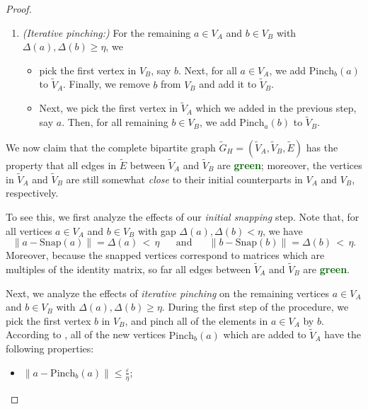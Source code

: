 \documentclass[11pt]{article}
\theoremstyle{plain}
\newcommand{\eps}{\varepsilon}
\begin{document}
\begin{proof}
\begin{enumerate}
\begin{itemize}
    \item delete $a$ from $V_A$ and $b$ from $V_B$.%
\end{itemize}

\item \emph{(Iterative pinching:)} For the remaining $a \in V_A$ and $b \in V_B$ with $\Delta(a),\Delta(b) \geq \eta$, we
\begin{itemize}
\item pick the first vertex in $V_B$, say $b$. Next, for all $a \in V_A$, we add $\mathrm{Pinch}_b(a)$ to $\tilde{V}_A$. Finally, we remove $b$ from $V_B$ and add it to $\tilde{V}_B$.

\item Next, we pick the first vertex in $\tilde{V}_A$ which we added in the previous step, say $a$. Then, for all remaining $b \in V_B$, we add $\mathrm{Pinch}_a(b)$ to $\tilde{V}_B$.
\end{itemize}
\end{enumerate}
We now claim that the complete bipartite graph $\tilde{G}_H = (\tilde{V}_A,\tilde{V}_B,\tilde{E})$ has the property that all edges in $\tilde{E}$ between $\tilde{V}_A$ and $\tilde{V}_B$ are \textbf{\textcolor{DarkGreen}{green}}; moreover, the vertices in $\tilde{V}_A$ and $\tilde{V}_B$ are still somewhat \emph{close} to their initial counterparts in $V_A$ and $V_B$, respectively.

To see this, we first analyze the effects of our \emph{initial snapping} step. Note that, for all vertices $a \in V_A$ and $b \in V_B$ with gap $\Delta(a),\Delta(b) < \eta$, we have
\begin{equation}
\| a- \mathrm{Snap}(a)\| = \Delta(a) \,< \, \eta \quad\,\, \text{ and } \quad \,\, \| b- \mathrm{Snap}(b)\| = \Delta(b) \, < \, \eta.   
\end{equation} 
Moreover, because the snapped vertices correspond to matrices which are multiples of the identity matrix, so far all edges between $\tilde{V}_A$ and $\tilde{V}_B$ are \textbf{\textcolor{DarkGreen}{green}}. 

Next, we analyze the effects of \emph{iterative pinching} on the remaining vertices $a \in V_A$ and $b \in V_B$ with $\Delta(a),\Delta(b) \geq \eta$. During the first step of the procedure, we pick the first vertex $b$ in $V_B$, and pinch all of the elements in $a \in V_A$ by $b$. According to , all of the new vertices $\mathrm{Pinch}_b(a)$ which are added to $\tilde{V}_A$ have the following properties:
\begin{itemize}
    \item $\|a - \mathrm{Pinch}_b(a) \| \leq \frac{\eps}{\eta}$;


\end{itemize}
\end{proof}
\end{document}
